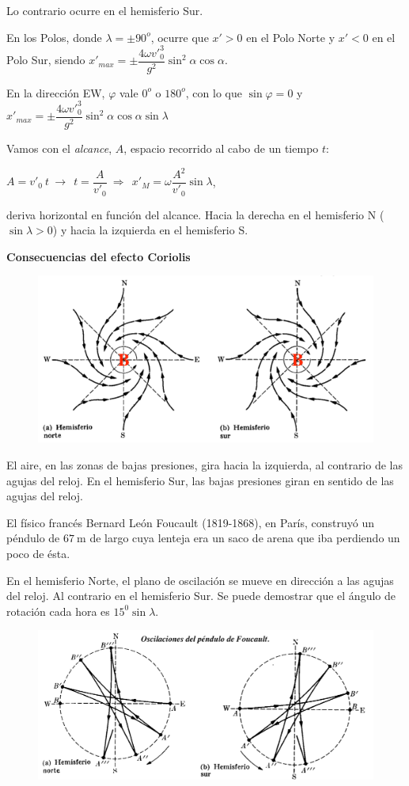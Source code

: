 Lo contrario ocurre en el hemisferio Sur.

En los Polos, donde $\lambda=\pm 90^o$, ocurre que $x'>0$ en el Polo Norte y $x'<0$ en el Polo Sur, siendo $x'_{max}=\pm \dfrac{4\omega {v'}_0^3}{g^2} \sin^2 \alpha \cos \alpha$.

En la dirección EW, $\varphi$ vale $0^o$ o $180^o$, con lo que $\sin \varphi=0$ y $x'_{max}=\pm \dfrac{4\omega {v'}_0^3}{g^2} \sin^2 \alpha \cos \alpha \sin \lambda$

Vamos con el \emph{alcance}, $A$, espacio recorrido al cabo de un tiempo $t$:

$A=v'_0\ t \ \to \ \ t=\dfrac A{v'_0} \ \Rightarrow \ \ x'_{M}=\omega \dfrac {A^2}{v'_0} \sin \lambda$, 

deriva horizontal en función del alcance. Hacia la derecha en el hemisferio N ($\sin \lambda>0$) y hacia la izquierda en el hemisferio S.

\textbf{Consecuencias del efecto Coriolis}

\begin{figure}[H]
	\centering
	\includegraphics[width=.8\textwidth]{imagenes/imagenes11/T11IM11.png}
\end{figure}

El aire, en las zonas de bajas presiones, gira hacia la izquierda, al contrario de las agujas del reloj. En el hemisferio Sur, las bajas presiones giran en sentido de las agujas del reloj.


El físico francés Bernard León Foucault (1819-1868), en París, construyó un péndulo de $67\ \text{m}$ de largo cuya lenteja era un saco de arena que iba perdiendo un poco de ésta.


En el hemisferio Norte, el plano de oscilación se mueve en dirección a las agujas del reloj. Al contrario en el hemisferio Sur. Se puede demostrar que el ángulo de rotación cada hora es $15^0 \sin \lambda$.

\begin{figure}[H]
	\centering
	\includegraphics[width=.85\textwidth]{imagenes/imagenes11/T11IM13.png}
\end{figure}

